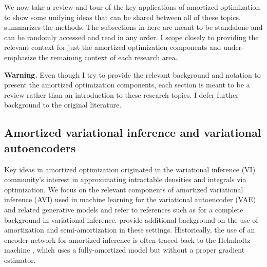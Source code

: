 \documentclass[twoside,11pt]{article}
\begin{document}
We now take a review and tour of the key applications
of amortized optimization to show some unifying ideas
that can be shared between all of these topics.
 summarizes the methods.
The subsections in here are meant to be standalone
and can be randomly accessed and read in any order.
I scope closely to providing the relevant context for
just the amortized optimization components and
under-emphasize the remaining context of each research area.

\textbf{Warning.}
Even though I try to provide the relevant background and notation to
present the amortized optimization components, each section is
meant to be a review rather than an introduction to
these research topics.
I defer further background to the original literature.

\subsection{Amortized variational inference and
  variational autoencoders}
\label{sec:apps:avi}
Key ideas in amortized optimization originated in the
variational inference (VI) community's interest in
approximating intractable densities and integrals
via optimization.
We focus on the relevant components of amortized
variational inference (AVI) used in machine learning
for the variational autoencoder (VAE) and
related generative models
\citep{kingma2013auto,rezende2014stochastic,mnih2014neural,rezende2015variational,higgins2016beta,doersch2016tutorial,kingma2019introduction}
and refer to references such as
\citet{jordan1999introduction,wainwright2008graphical,blei2017variational}
for a complete background in variational inference.
\citet{kim2020deep,marino2021learned} provide additional background
on the use of amortization and semi-amortization in these settings.
Historically, the use of an encoder network for amortized inference
is often traced back to the Helmholtz machine \citep{dayan1995helmholtz},
which uses a fully-amortized model but without a proper gradient estimator.
\end{document}

